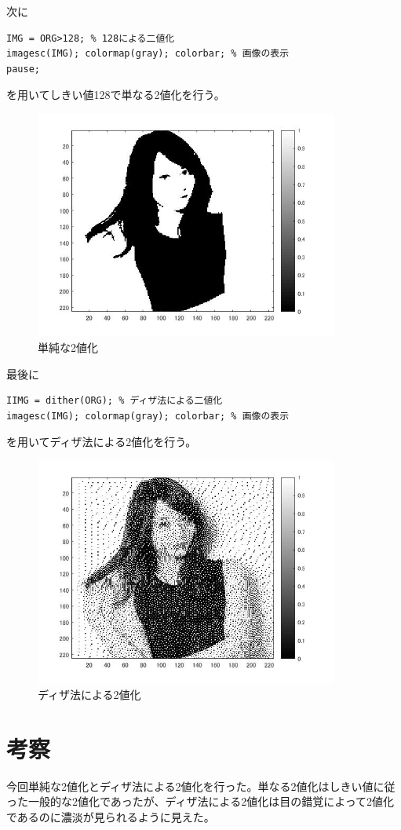 \documentclass{jsarticle}
\begin{document}
次に
\begin{lstlisting}[basicstyle=\ttfamily\footnotesize, frame=single]
IMG = ORG>128; % 128による二値化
imagesc(IMG); colormap(gray); colorbar; % 画像の表示
pause;
 \end{lstlisting}
を用いてしきい値128で単なる2値化を行う。

\newpage
\begin{figure}[htbp]
 \begin{center}
  \includegraphics[width=10cm]{kadai6-1.jpg}
 \end{center}
 \caption{単純な2値化}
\end{figure}

最後に
\begin{lstlisting}[basicstyle=\ttfamily\footnotesize, frame=single]
IIMG = dither(ORG); % ディザ法による二値化
imagesc(IMG); colormap(gray); colorbar; % 画像の表示
 \end{lstlisting}
を用いてディザ法による2値化を行う。

\newpage
\begin{figure}[htbp]
 \begin{center}
  \includegraphics[width=10cm]{kadai6-2.jpg}
 \end{center}
 \caption{ディザ法による2値化}
\end{figure}


\section{考察}
今回単純な2値化とディザ法による2値化を行った。単なる2値化はしきい値に従った一般的な2値化であったが、ディザ法による2値化は目の錯覚によって2値化であるのに濃淡が見られるように見えた。
\end{document}

